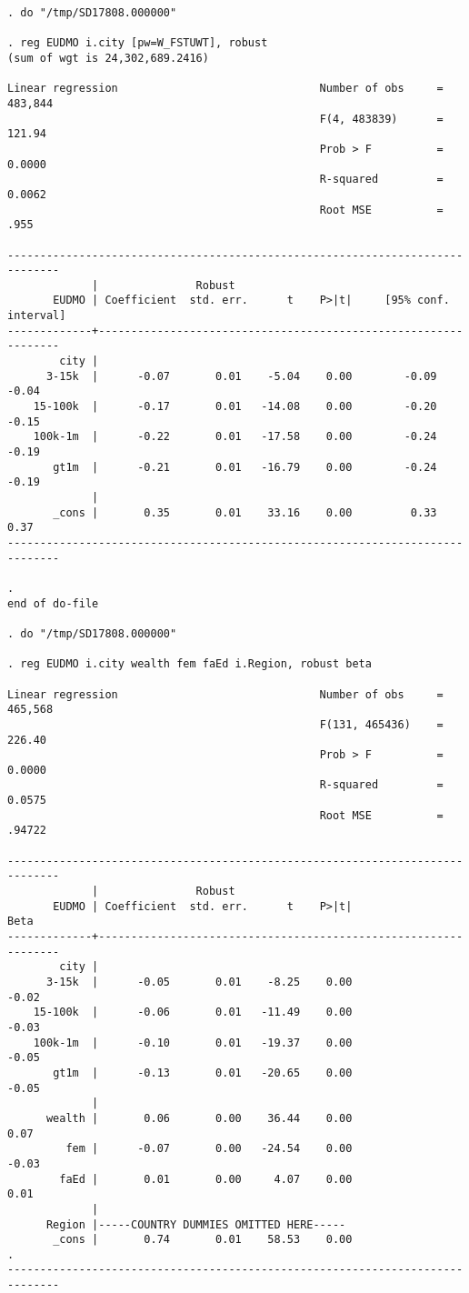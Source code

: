 \documentclass[11pt, letterpaper]{article}
\begin{document}
\begin{spacing}{1.9}
\begin{spacing}{.5}
\begin{scriptsize}
\begin{verbatim}
. do "/tmp/SD17808.000000"

. reg EUDMO i.city [pw=W_FSTUWT], robust  
(sum of wgt is 24,302,689.2416)

Linear regression                               Number of obs     =    483,844
                                                F(4, 483839)      =     121.94
                                                Prob > F          =     0.0000
                                                R-squared         =     0.0062
                                                Root MSE          =       .955

------------------------------------------------------------------------------
             |               Robust
       EUDMO | Coefficient  std. err.      t    P>|t|     [95% conf. interval]
-------------+----------------------------------------------------------------
        city |
      3-15k  |      -0.07       0.01    -5.04    0.00        -0.09       -0.04
    15-100k  |      -0.17       0.01   -14.08    0.00        -0.20       -0.15
    100k-1m  |      -0.22       0.01   -17.58    0.00        -0.24       -0.19
       gt1m  |      -0.21       0.01   -16.79    0.00        -0.24       -0.19
             |
       _cons |       0.35       0.01    33.16    0.00         0.33        0.37
------------------------------------------------------------------------------

. 
end of do-file

. do "/tmp/SD17808.000000"

. reg EUDMO i.city wealth fem faEd i.Region, robust beta 

Linear regression                               Number of obs     =    465,568
                                                F(131, 465436)    =     226.40
                                                Prob > F          =     0.0000
                                                R-squared         =     0.0575
                                                Root MSE          =     .94722

------------------------------------------------------------------------------
             |               Robust
       EUDMO | Coefficient  std. err.      t    P>|t|                     Beta
-------------+----------------------------------------------------------------
        city |
      3-15k  |      -0.05       0.01    -8.25    0.00                    -0.02
    15-100k  |      -0.06       0.01   -11.49    0.00                    -0.03
    100k-1m  |      -0.10       0.01   -19.37    0.00                    -0.05
       gt1m  |      -0.13       0.01   -20.65    0.00                    -0.05
             |
      wealth |       0.06       0.00    36.44    0.00                     0.07
         fem |      -0.07       0.00   -24.54    0.00                    -0.03
        faEd |       0.01       0.00     4.07    0.00                     0.01
             |
      Region |-----COUNTRY DUMMIES OMITTED HERE-----
       _cons |       0.74       0.01    58.53    0.00                        .
------------------------------------------------------------------------------


\end{verbatim}
\end{scriptsize}
\end{spacing}
\end{spacing}
\end{document}

